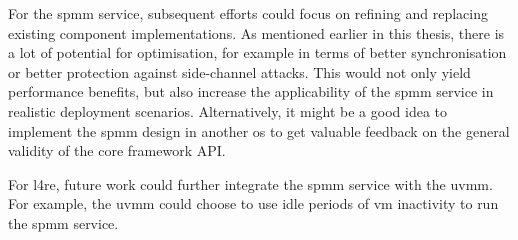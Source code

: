 For the \ac{spmm} service, subsequent efforts could focus on refining and replacing existing component implementations.
As mentioned earlier in this thesis, there is a lot of potential for optimisation, for example in terms of better synchronisation or better protection against side-channel attacks.
This would not only yield performance benefits, but also increase the applicability of the \ac{spmm} service in realistic deployment scenarios.
Alternatively, it might be a good idea to implement the \ac{spmm} design in another \ac{os} to get valuable feedback on the general validity of the core framework API.

For \ac{l4re}, future work could further integrate the \ac{spmm} service with the \ac{uvmm}.
For example, the \ac{uvmm} could choose to use idle periods of \ac{vm} inactivity to run the \ac{spmm} service.
